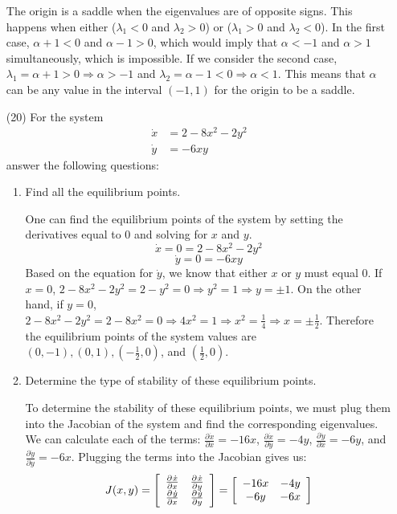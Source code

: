 \documentclass[12pt,letterpaper,reqno]{amsart}
\newcommand*{\pd}[3][]{\ensuremath{\frac{\partial^{#1} #2}{\partial #3}}}
\begin{document}
\begin{enumerate}
\begin{flushleft}
The origin is a saddle when the eigenvalues are of opposite signs. This happens when either ($\lambda_1 < 0$ and $\lambda_2 >0$) or ($\lambda_1 > 0$ and $\lambda_2 < 0$). In the first case, $\alpha + 1 < 0$ and $\alpha - 1>0$, which would imply that $\alpha < -1$ and $\alpha > 1$ simultaneously, which is impossible. If we consider the second case, $\lambda_1 = \alpha +1 > 0 \Rightarrow \alpha > -1$ and $\lambda_2 = \alpha - 1 < 0 \Rightarrow \alpha < 1$. This means that $\alpha$ can be any value in the interval $(-1,1)$ for the origin to be a saddle.
\end{flushleft}
\newpage
\item[(20)] For the system
$$\left.\begin{aligned} \dot { x } & = 2 - 8 x ^ { 2 } - 2 y ^ { 2 } \\ \dot { y } & = - 6 x y \end{aligned} \right.$$
answer the following questions:\newline
\begin{enumerate}
    \item Find all the equilibrium points.\newline
    \begin{flushleft}
    One can find the equilibrium points of the system by setting the derivatives equal to 0 and solving for $x$ and $y$.
    $$\dot{x} = 0 = 2 - 8x^2 - 2y^2$$
    $$\dot{y} = 0 = -6xy$$
    Based on the equation for $\dot{y}$, we know that either $x$ or $y$ must equal 0. If $x = 0$, $2 - 8x^2 - 2y^2 = 2 - y^2 = 0 \Rightarrow y^2 = 1 \Rightarrow y = \pm 1$. On the other hand, if $y = 0$, $2 - 8x^2 - 2y^2 = 2 - 8x^2 = 0 \Rightarrow 4x^2 = 1 \Rightarrow x^2 = \frac{1}{4} \Rightarrow x = \pm \frac{1}{2}$. Therefore the equilibrium points of the system values are $(0,-1), (0,1), (-\frac{1}{2}, 0)$, and $(\frac{1}{2}, 0)$.
    \newline
    \end{flushleft}
    \item Determine the type of stability of these equilibrium points.\newline
    \begin{flushleft}
    To determine the stability of these equilibrium points, we must plug them into the Jacobian of the system and find the corresponding eigenvalues. We can calculate each of the terms: $\pd{\dot{x}}{x} = -16x$, $\pd{\dot{x}}{y} = -4y$, $\pd{\dot{y}}{x} = -6y$, and $\pd{\dot{y}}{y} = -6x$. Plugging the terms into the Jacobian gives us:
    \renewcommand\arraystretch{1.5}
    $$J(x,y) = \left[ \begin{array} { c c } { \pd{\dot{x}}{x} } & { \pd{\dot{x}}{y} } \\ { \pd{\dot{y}}{x} } & { \pd{\dot{y}}{y} } \end{array} \right] = \left[ \begin{array} { c c } { -16x } & { -4y } \\ { -6y } & { -6x } \end{array} \right]$$

\end{flushleft}
\end{enumerate}
\end{enumerate}
\end{document}
